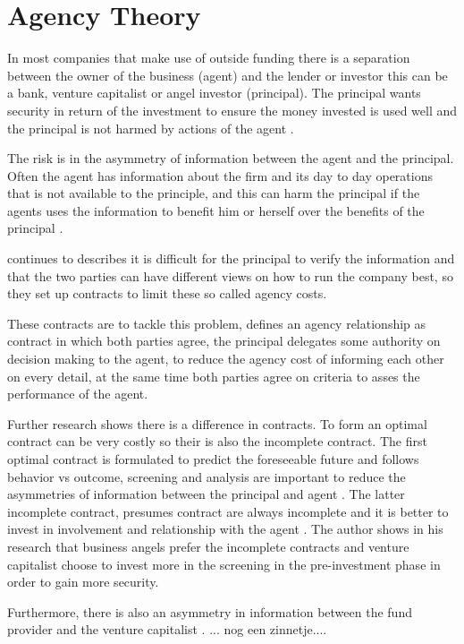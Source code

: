 \documentclass[a4paper, 11pt]{article}
\begin{document}
\section{Agency Theory}

In most companies that make use of outside funding there is a separation between
the owner of the business (agent) and the lender or investor this can be a
bank, venture capitalist or angel investor (principal). The principal wants
security in return of the investment to ensure the money invested is used well
and the principal is not harmed by actions of the agent \citep{jensen1976theory}.

The risk is in the asymmetry of information between the agent and the principal. Often the
agent has information about the firm and its day to day operations that is not
available to the principle, and this can harm the principal if the agents uses the
information to benefit him or herself over the benefits of the principal
\citep{Osnabrugge2000}.

\cite{Osnabrugge2000} continues to describes it is difficult for the principal to verify the information and that the two parties can have different views on how to run the company best, so they set up contracts to limit these so called agency costs.


These contracts are to tackle this problem, \citep{jensen1976theory} defines an agency relationship as contract in which both parties agree, the principal delegates some authority on decision making to the agent, to reduce the agency cost of informing each other on every detail, at the same time both parties agree on criteria to asses the performance of the agent.

Further research shows there is a difference in contracts. To form an optimal contract can be very costly so their is also the incomplete contract. The first optimal contract is formulated to predict the foreseeable future and follows behavior vs outcome, screening and analysis are important to reduce the asymmetries of information between the principal and agent \citep{Osnabrugge2000}. The latter incomplete contract, presumes contract are always incomplete and it is better to invest in involvement and relationship with the agent \citep{Osnabrugge2000}. The author shows in his research that business angels prefer the incomplete contracts and venture capitalist choose to invest more in the screening in the pre-investment phase in order to gain more security.

Furthermore, there is also an asymmetry in information between the fund provider and the venture capitalist \citep{casson2008oxford}. ... nog een zinnetje....
\end{document}
